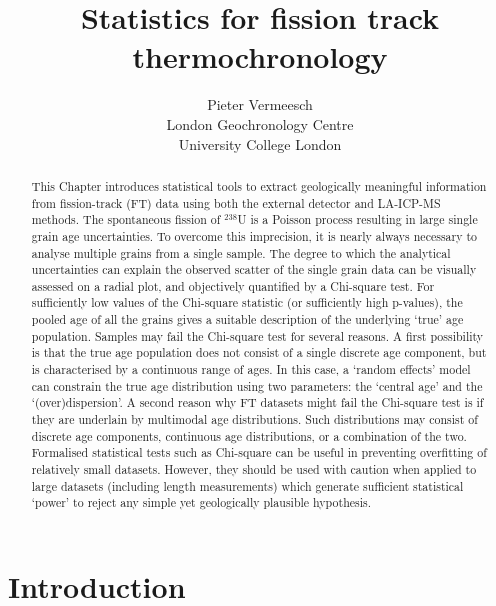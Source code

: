 \documentclass{article}
\title{Statistics for fission track thermochronology}
\author{Pieter Vermeesch\\London Geochronology Centre\\University
  College London}
\begin{document}
\maketitle

\begin{abstract}
This Chapter introduces statistical tools to extract geologically
meaningful information from fission-track (FT) data using both the
external detector and LA-ICP-MS methods. The spontaneous fission of
$^{238}$U is a Poisson process resulting in large single grain age
uncertainties. To overcome this imprecision, it is nearly always
necessary to analyse multiple grains from a single sample. The degree
to which the analytical uncertainties can explain the observed scatter
of the single grain data can be visually assessed on a radial plot,
and objectively quantified by a Chi-square test. For sufficiently low
values of the Chi-square statistic (or sufficiently high p-values),
the pooled age of all the grains gives a suitable description of the
underlying `true' age population. Samples may fail the Chi-square test
for several reasons. A first possibility is that the true age
population does not consist of a single discrete age component, but is
characterised by a continuous range of ages. In this case, a `random
effects' model can constrain the true age distribution using two
parameters: the `central age' and the `(over)dispersion'. A second
reason why FT datasets might fail the Chi-square test is if they are
underlain by multimodal age distributions. Such distributions may
consist of discrete age components, continuous age distributions, or a
combination of the two. Formalised statistical tests such as
Chi-square can be useful in preventing overfitting of relatively small
datasets. However, they should be used with caution when applied to
large datasets (including length measurements) which generate
sufficient statistical `power' to reject any simple yet geologically
plausible hypothesis.
\end{abstract}

\section{Introduction}
\end{document}
